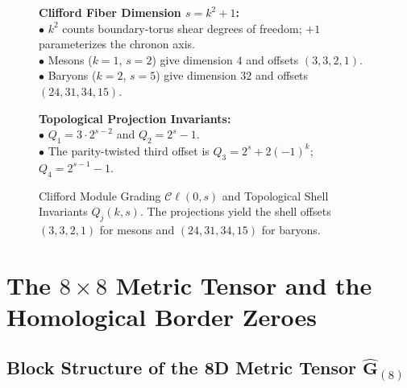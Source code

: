 \documentclass[
    12pt,
    a4paper,
    headings=normal,
    twoside=false,
    open=any,
    parskip=half
]{scrbook}
\begin{document}
\begin{figure}[htbp]
\begin{tcolorbox}[colback=white, colframe=secondarycolor!70, arc=2mm, boxrule=0.7pt, left=6pt, right=6pt, top=4pt, bottom=4pt, width=\linewidth]
\scriptsize\sffamily
\begin{minipage}[t]{0.48\textwidth}
  \textbf{\color{maincolor}Clifford Fiber Dimension $s=k^2+1$:}\\[1pt]
  $\bullet$ $k^2$ counts boundary-torus shear degrees of freedom; $+1$ parameterizes the chronon axis.\\[1pt]
  $\bullet$ Mesons ($k=1$, $s=2$) give dimension $4$ and offsets $(3,3,2,1)$.\\[1pt]
  $\bullet$ Baryons ($k=2$, $s=5$) give dimension $32$ and offsets $(24,31,34,15)$.
\end{minipage}\hfill
\begin{minipage}[t]{0.48\textwidth}
  \textbf{\color{accentcolor}Topological Projection Invariants:}\\[1pt]
  $\bullet$ $Q_1=3\cdot2^{s-2}$ and $Q_2=2^s-1$.\\[1pt]
  $\bullet$ The parity-twisted third offset is $Q_3=2^s+2(-1)^k$; $Q_4=2^{s-1}-1$.
\end{minipage}
\end{tcolorbox}
\vspace{-2mm}
\caption{Clifford Module Grading $\mathcal{C}\ell(0,s)$ and Topological Shell Invariants $Q_j(k,s)$. The projections yield the shell offsets $(3,3,2,1)$ for mesons and $(24,31,34,15)$ for baryons.}
\label{fig:ch10_clifford_module_grading}
\end{figure}

\section{The $8 \times 8$ Metric Tensor and the Homological Border Zeroes}
\label{sec:ch10_metric_tensor_border_zeroes}

\subsection{Block Structure of the 8D Metric Tensor $\hat{\mathbf{G}}_{(8)}$}
\end{document}
